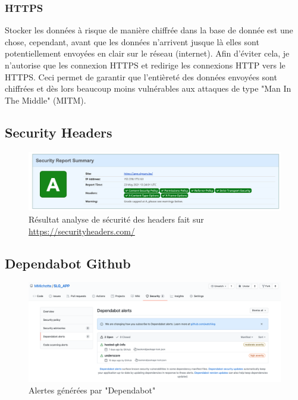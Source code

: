\subsubsection{HTTPS}
Stocker les données à risque de manière chiffrée dans la base de donnée est une chose, cependant, avant que les données n'arrivent jusque là elles sont potentiellement envoyées en clair sur le réseau (internet). Afin d'éviter cela, je n'autorise que les connexion HTTPS et redirige les connexions HTTP vers le HTTPS. Ceci permet de garantir que l'entièreté des données envoyées sont chiffrées et dès lors beaucoup moins vulnérables aux attaques de type "Man In The Middle" (MITM).

\newpage

\subsection{Security Headers}
\begin{figure}[H]
  \centering
  \includegraphics[width=\linewidth]{img/securityHeaders.png}
  \caption{Résultat analyse de sécurité des headers fait sur \url{https://securityheaders.com/}}
\end{figure}

\subsection{Dependabot Github}
\begin{figure}[H]
  \centering
  \includegraphics[width=\linewidth]{img/dependabot.png}
  \caption{Alertes générées par "Dependabot"}
\end{figure}